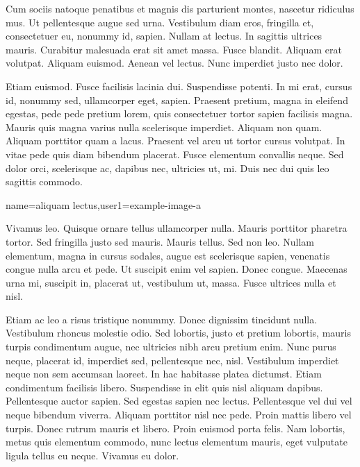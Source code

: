 
%
{%
Cum sociis natoque penatibus et magnis dis parturient montes,
nascetur ridiculus mus. Ut pellentesque augue sed urna. Vestibulum
diam eros, fringilla et, consectetuer eu, nonummy id, sapien. Nullam
at lectus. In sagittis ultrices mauris. Curabitur malesuada erat sit
amet massa. Fusce blandit. Aliquam erat volutpat.  Aliquam euismod.
Aenean vel lectus.  Nunc imperdiet justo nec dolor.

Etiam euismod. Fusce facilisis lacinia dui.  Suspendisse potenti. In
mi erat, cursus id, nonummy sed, ullamcorper eget, sapien. Praesent
pretium, magna in eleifend egestas, pede pede pretium lorem, quis
consectetuer tortor sapien facilisis magna.  Mauris quis magna
varius nulla scelerisque imperdiet. Aliquam non quam. Aliquam
porttitor quam a lacus. Praesent vel arcu ut tortor cursus volutpat.
In vitae pede quis diam bibendum placerat. Fusce elementum convallis
neque. Sed dolor orci, scelerisque ac, dapibus nec, ultricies ut,
mi. Duis nec dui quis leo sagittis commodo.
}

%
{name={aliquam lectus},user1={example-image-a}}%
{%
Vivamus leo. Quisque ornare tellus ullamcorper nulla. Mauris
porttitor pharetra tortor. Sed fringilla justo sed mauris. Mauris
tellus. Sed non leo. Nullam elementum, magna in cursus sodales,
augue est scelerisque sapien, venenatis congue nulla arcu et pede.
Ut suscipit enim vel sapien.  Donec congue. Maecenas urna mi,
suscipit in, placerat ut, vestibulum ut, massa. Fusce ultrices nulla
et nisl.

Etiam ac leo a risus tristique nonummy. Donec dignissim tincidunt
nulla. Vestibulum rhoncus molestie odio. Sed lobortis, justo et
pretium lobortis, mauris turpis condimentum augue, nec ultricies
nibh arcu pretium enim. Nunc purus neque, placerat id, imperdiet
sed, pellentesque nec, nisl. Vestibulum imperdiet neque non sem
accumsan laoreet. In hac habitasse platea dictumst. Etiam
condimentum facilisis libero. Suspendisse in elit quis nisl aliquam
dapibus. Pellentesque auctor sapien. Sed egestas sapien nec lectus.
Pellentesque vel dui vel neque bibendum viverra.  Aliquam porttitor
nisl nec pede. Proin mattis libero vel turpis.  Donec rutrum mauris
et libero. Proin euismod porta felis. Nam lobortis, metus quis
elementum commodo, nunc lectus elementum mauris, eget vulputate
ligula tellus eu neque. Vivamus eu dolor.
}

